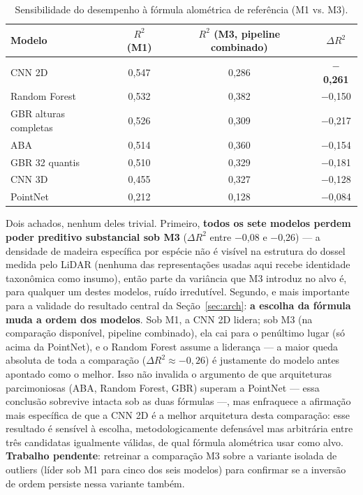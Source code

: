 \begin{table}[H]
  \centering
  \caption{Sensibilidade do desempenho à fórmula alométrica de referência
  (M1 vs. M3).}
  \label{tab:m1m3}
  \begin{tabular}{lccc}
    \toprule
    \textbf{Modelo} & \textbf{$R^2$ (M1)} &
      \textbf{$R^2$ (M3, pipeline combinado)} & \textbf{$\Delta R^2$} \\
    \midrule
    CNN 2D                 & 0,547 & 0,286 & \textbf{$-$0,261} \\
    Random Forest          & 0,532 & 0,382 & $-$0,150 \\
    GBR alturas completas  & 0,526 & 0,309 & $-$0,217 \\
    ABA                    & 0,514 & 0,360 & $-$0,154 \\
    GBR 32 quantis         & 0,510 & 0,329 & $-$0,181 \\
    CNN 3D                 & 0,455 & 0,327 & $-$0,128 \\
    PointNet               & 0,212 & 0,128 & $-$0,084 \\
    \bottomrule
  \end{tabular}
\end{table}

Dois achados, nenhum deles trivial. Primeiro, \textbf{todos os sete modelos perdem
poder preditivo substancial sob M3} ($\Delta R^2$ entre $-$0,08 e $-$0,26) --- a
densidade de madeira específica por espécie não é visível na estrutura do dossel
medida pelo LiDAR (nenhuma das representações usadas aqui recebe identidade
taxonômica como insumo), então parte da variância que M3 introduz no alvo é, para
qualquer um destes modelos, ruído irredutível. Segundo, e mais importante para a
validade do resultado central da Seção~\ref{sec:arch}: \textbf{a escolha da fórmula
muda a ordem dos modelos}. Sob M1, a CNN 2D lidera; sob M3 (na comparação
disponível, pipeline combinado), ela cai para o penúltimo lugar (só acima da
PointNet), e o Random Forest assume a liderança --- a maior queda absoluta de toda
a comparação ($\Delta R^2 \approx -0,26$) é justamente do modelo antes apontado
como o melhor. Isso não invalida o argumento de que arquiteturas parcimoniosas
(ABA, Random Forest, GBR) superam a PointNet --- essa conclusão sobrevive intacta
sob as duas fórmulas ---, mas enfraquece a afirmação mais específica de que a
CNN 2D é a melhor arquitetura desta comparação: esse resultado é sensível à
escolha, metodologicamente defensável mas arbitrária entre três candidatas
igualmente válidas, de qual fórmula alométrica usar como alvo. \textbf{Trabalho
pendente}: retreinar a comparação M3 sobre a variante isolada de outliers (líder
sob M1 para cinco dos seis modelos) para confirmar se a inversão de ordem persiste
nessa variante também.

